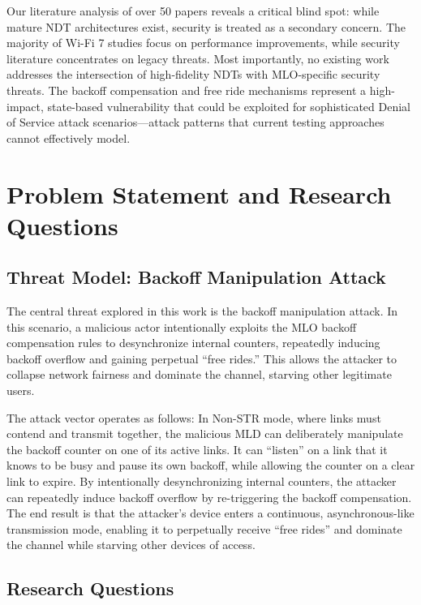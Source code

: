 \documentclass[conference]{IEEEtran}
\begin{document}
Our literature analysis of over 50 papers reveals a critical blind spot: while mature NDT architectures exist, security is treated as a secondary concern. The majority of Wi-Fi 7 studies focus on performance improvements, while security literature concentrates on legacy threats. Most importantly, no existing work addresses the intersection of high-fidelity NDTs with MLO-specific security threats. The backoff compensation and free ride mechanisms represent a high-impact, state-based vulnerability that could be exploited for sophisticated Denial of Service attack scenarios---attack patterns that current testing approaches cannot effectively model.

\section{Problem Statement and Research Questions}
\label{sec:problem}

\subsection{Threat Model: Backoff Manipulation Attack}

The central threat explored in this work is the backoff manipulation attack. In this scenario, a malicious actor intentionally exploits the MLO backoff compensation rules to desynchronize internal counters, repeatedly inducing backoff overflow and gaining perpetual ``free rides.'' This allows the attacker to collapse network fairness and dominate the channel, starving other legitimate users.

The attack vector operates as follows: In Non-STR mode, where links must contend and transmit together, the malicious MLD can deliberately manipulate the backoff counter on one of its active links. It can ``listen'' on a link that it knows to be busy and pause its own backoff, while allowing the counter on a clear link to expire. By intentionally desynchronizing internal counters, the attacker can repeatedly induce backoff overflow by re-triggering the backoff compensation. The end result is that the attacker's device enters a continuous, asynchronous-like transmission mode, enabling it to perpetually receive ``free rides'' and dominate the channel while starving other devices of access.

\subsection{Research Questions}
\end{document}
